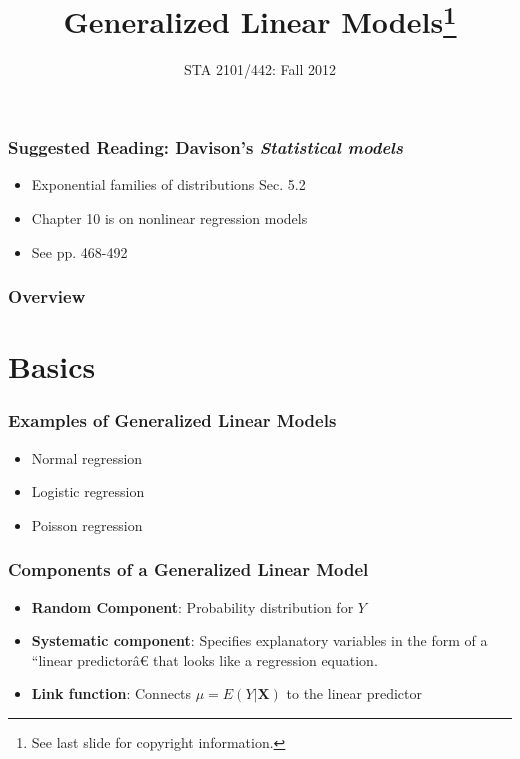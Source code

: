 \documentclass[serif]{beamer} %
\title{Generalized Linear Models\footnote{See last slide for copyright information.}}
\subtitle{STA 2101/442: Fall 2012}
\date{} %
\begin{document}


\begin{frame}
  \titlepage
\end{frame}

\begin{frame}
\frametitle{Suggested Reading: Davison's \emph{Statistical models}}
  \begin{itemize}
    \item Exponential families of distributions Sec. 5.2
    \item Chapter 10 is on nonlinear regression models
    \item See pp. 468-492
  \end{itemize}

\end{frame}



 \begin{frame}
 \frametitle{Overview}
 \tableofcontents
 \end{frame}

\section{Basics} %

\begin{frame}
\frametitle{Examples of Generalized Linear Models}
  \begin{itemize}
    \item Normal regression
    \item Logistic regression
    \item Poisson regression

  \end{itemize}
\end{frame}

\begin{frame}
\frametitle{Components of a Generalized Linear Model}
  \begin{itemize}
    \item \textbf{Random Component}:  Probability distribution for $Y$
    \item \textbf{Systematic component}:  Specifies explanatory variables in the form of a ``linear predictorâ€ that looks like a regression equation.
    \item \textbf{Link function}:  Connects $\mu = E(Y|\mathbf{X})$ to the linear predictor

  \end{itemize}
\end{frame}
\end{document}
